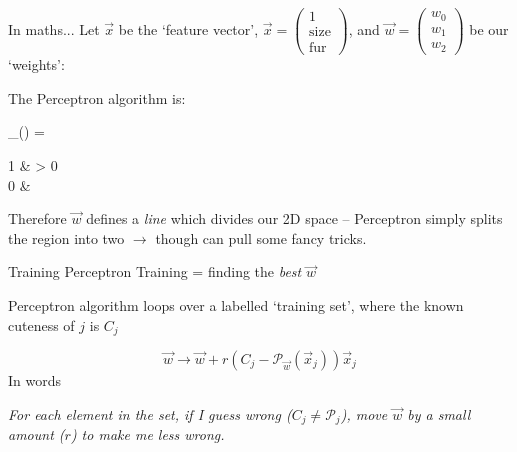 \documentclass[]{SangerLibrary/sanger-present}
\begin{document}
	\begin{frame}{In maths...}
		Let $\vec{x}$ be the `feature vector', $\vec{x} = \begin{pmatrix}1 \\ \text{size} \\ \text{fur}\end{pmatrix}$, and $\vec{w} = \begin{pmatrix} w_0 \\ w_1 \\ w_2 \end{pmatrix}$ be our `weights':


		\pause The Perceptron algorithm is:

		\begin{spalign}
			{_{}}() =  \begin{cases} 1  &  \cdot {} > 0
				\\
				0 & \end{cases}
		\end{spalign}


		\pause Therefore $\vec{w}$ defines a \textit{line} which divides our 2D space -- Perceptron simply splits the region into two $\to$ though can pull some fancy tricks.
	\end{frame}

	\begin{frame}{Training Perceptron}
		Training = finding the \textit{best} $\vec{w}$
		
		\pause Perceptron algorithm loops over a labelled `training set', where the known cuteness of $j$ is $C_j$

		\begin{equation}
			\vec{w} \to \vec{w} + r \left(C_j - \mathcal{P}_{\vec{w}}(\vec{x}_j) \right)\vec{x}_j
		\end{equation}
		\pause In words
		
		{\centering \it For each element in the set, if I guess wrong ($C_j \neq \mathcal{P}_j$), move $\vec{w}$ by a small amount ($r$) to make me less wrong.}
	\end{frame}
\end{document}
